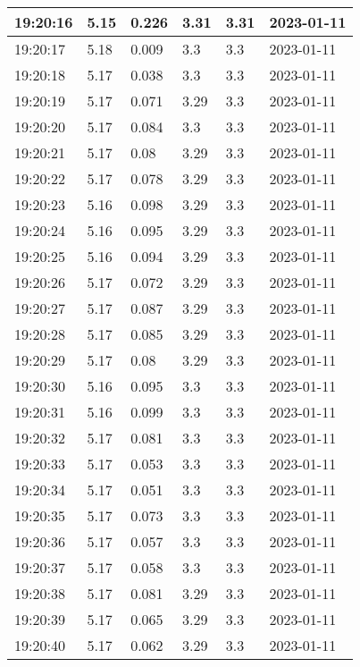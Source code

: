 \begin{longtable}{|l|l|l|l|l|l|}
        19:20:16 & 5.15 & 0.226 & 3.31 & 3.31 & 2023-01-11 \\ \hline
        19:20:17 & 5.18 & 0.009 & 3.3 & 3.3 & 2023-01-11 \\ \hline
        19:20:18 & 5.17 & 0.038 & 3.3 & 3.3 & 2023-01-11 \\ \hline
        19:20:19 & 5.17 & 0.071 & 3.29 & 3.3 & 2023-01-11 \\ \hline
        19:20:20 & 5.17 & 0.084 & 3.3 & 3.3 & 2023-01-11 \\ \hline
        19:20:21 & 5.17 & 0.08 & 3.29 & 3.3 & 2023-01-11 \\ \hline
        19:20:22 & 5.17 & 0.078 & 3.29 & 3.3 & 2023-01-11 \\ \hline
        19:20:23 & 5.16 & 0.098 & 3.29 & 3.3 & 2023-01-11 \\ \hline
        19:20:24 & 5.16 & 0.095 & 3.29 & 3.3 & 2023-01-11 \\ \hline
        19:20:25 & 5.16 & 0.094 & 3.29 & 3.3 & 2023-01-11 \\ \hline
        19:20:26 & 5.17 & 0.072 & 3.29 & 3.3 & 2023-01-11 \\ \hline
        19:20:27 & 5.17 & 0.087 & 3.29 & 3.3 & 2023-01-11 \\ \hline
        19:20:28 & 5.17 & 0.085 & 3.29 & 3.3 & 2023-01-11 \\ \hline
        19:20:29 & 5.17 & 0.08 & 3.29 & 3.3 & 2023-01-11 \\ \hline
        19:20:30 & 5.16 & 0.095 & 3.3 & 3.3 & 2023-01-11 \\ \hline
        19:20:31 & 5.16 & 0.099 & 3.3 & 3.3 & 2023-01-11 \\ \hline
        19:20:32 & 5.17 & 0.081 & 3.3 & 3.3 & 2023-01-11 \\ \hline
        19:20:33 & 5.17 & 0.053 & 3.3 & 3.3 & 2023-01-11 \\ \hline
        19:20:34 & 5.17 & 0.051 & 3.3 & 3.3 & 2023-01-11 \\ \hline
        19:20:35 & 5.17 & 0.073 & 3.3 & 3.3 & 2023-01-11 \\ \hline
        19:20:36 & 5.17 & 0.057 & 3.3 & 3.3 & 2023-01-11 \\ \hline
        19:20:37 & 5.17 & 0.058 & 3.3 & 3.3 & 2023-01-11 \\ \hline
        19:20:38 & 5.17 & 0.081 & 3.29 & 3.3 & 2023-01-11 \\ \hline
        19:20:39 & 5.17 & 0.065 & 3.29 & 3.3 & 2023-01-11 \\ \hline
        19:20:40 & 5.17 & 0.062 & 3.29 & 3.3 & 2023-01-11 \\ \hline

\end{longtable}
